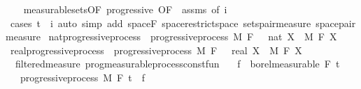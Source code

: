 \begin{isabellebody}
%
\isadelimproof
\ \ %
\endisadelimproof
%
\isatagproof
{}\isamarkupfalse%
\ measurable{\isacharunderscore}{\kern0pt}sets{\isacharbrackleft}{\kern0pt}OF\ progressive{\isacharcomma}{\kern0pt}\ OF\ {\isacharunderscore}{\kern0pt}\ assms{\isacharcomma}{\kern0pt}\ of\ i{\isacharbrackright}{\kern0pt}\isanewline
\ \ \isamarkupfalse%
\ {\isacharparenleft}{\kern0pt}cases\ {\isachardoublequoteopen}t\ {\isasymle}\ i{\isachardoublequoteclose}{\isacharparenright}{\kern0pt}\ {\isacharparenleft}{\kern0pt}auto\ simp\ add{\isacharcolon}{\kern0pt}\ space{\isacharunderscore}{\kern0pt}F\ space{\isacharunderscore}{\kern0pt}restrict{\isacharunderscore}{\kern0pt}space\ sets{\isacharunderscore}{\kern0pt}pair{\isacharunderscore}{\kern0pt}measure\ space{\isacharunderscore}{\kern0pt}pair{\isacharunderscore}{\kern0pt}measure{\isacharparenright}{\kern0pt}%
\endisatagproof
{\isafoldproof}%
%
\isadelimproof
\isanewline
%
\endisadelimproof
\isanewline
{}\isamarkupfalse%
\isanewline
\isanewline
{}\isamarkupfalse%
\ nat{\isacharunderscore}{\kern0pt}progressive{\isacharunderscore}{\kern0pt}process\ {\isacharequal}{\kern0pt}\ progressive{\isacharunderscore}{\kern0pt}process\ M\ F\ {\isachardoublequoteopen}{}\ {\isacharcolon}{\kern0pt}{\isacharcolon}{\kern0pt}\ nat{\isachardoublequoteclose}\ X\ \ M\ F\ X\isanewline
{}\isamarkupfalse%
\ real{\isacharunderscore}{\kern0pt}progressive{\isacharunderscore}{\kern0pt}process\ {\isacharequal}{\kern0pt}\ progressive{\isacharunderscore}{\kern0pt}process\ M\ F\ {\isachardoublequoteopen}{}\ {\isacharcolon}{\kern0pt}{\isacharcolon}{\kern0pt}\ real{\isachardoublequoteclose}\ X\ \ M\ F\ X\isanewline
\isanewline
{}\isamarkupfalse%
\ {\isacharparenleft}{\kern0pt}\ filtered{\isacharunderscore}{\kern0pt}measure{\isacharparenright}{\kern0pt}\ prog{\isacharunderscore}{\kern0pt}measurable{\isacharunderscore}{\kern0pt}process{\isacharunderscore}{\kern0pt}const{\isacharunderscore}{\kern0pt}fun{\isacharcolon}{\kern0pt}\isanewline
\ \ \ {\isachardoublequoteopen}f\ {\isasymin}\ borel{\isacharunderscore}{\kern0pt}measurable\ {\isacharparenleft}{\kern0pt}F\ t\isanewline
\ \ \ {\isachardoublequoteopen}progressive{\isacharunderscore}{\kern0pt}process\ M\ F\ t\ {\isacharparenleft}{\kern0pt}{\isasymlambda}{\isacharunderscore}{\kern0pt}{\isachardot}{\kern0pt}\ f{\isacharparenright}{\kern0pt}{\isachardoublequoteclose}\isanewline

\end{isabellebody}
